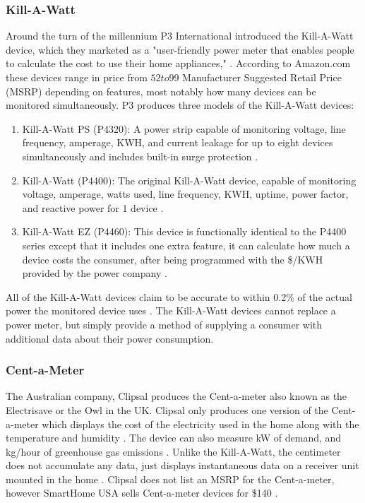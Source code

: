 \subsubsection{Kill-A-Watt} %
Around the turn of the millennium P3 International introduced the Kill-A-Watt device, which they marketed as a "user-friendly power meter that enables people to calculate the cost to use their home appliances," \cite{About_P3}. According to Amazon.com these devices range in price from $52 to $99 Manufacturer Suggested Retail Price (MSRP) depending on features, most notably how many devices can be monitored simultaneously. P3 produces three models of the Kill-A-Watt devices:
\begin{enumerate}
\item Kill-A-Watt PS (P4320): A power strip capable of monitoring voltage, line frequency, amperage, KWH, and current leakage for up to eight devices simultaneously and includes built-in surge protection \cite{P4320_Datasheet}.
\item Kill-A-Watt (P4400): The original Kill-A-Watt device, capable of monitoring voltage, amperage, watts used, line frequency, KWH, uptime, power factor, and reactive power for 1 device \cite{P4400_Datasheet}.
\item Kill-A-Watt EZ (P4460): This device is functionally identical to the P4400 series except that it includes one extra feature, it can calculate how much a device costs the consumer, after being programmed with the \$/KWH provided by the power company \cite{P4460_Datasheet}.
\end{enumerate}
All of the Kill-A-Watt devices claim to be accurate to within 0.2\% of the actual power the monitored device uses \cite{P4320_Datasheet}\cite{P4400_Datasheet}\cite{P4460_Datasheet}. The Kill-A-Watt devices cannot replace a power meter, but simply provide a method of supplying a consumer with additional data about their power consumption.

\subsubsection{Cent-a-Meter} %
The Australian company, Clipsal produces the Cent-a-meter also known as the Electrisave or the Owl in the UK. Clipsal only produces one version of the Cent-a-meter which displays the cost of the electricity used in the home along with the temperature and humidity \cite{Clipsal_CentAMeter}. The device can also measure kW of demand, and kg/hour of greenhouse gas emissions \cite{SmartHomeUSA}. Unlike the Kill-A-Watt, the centimeter does not accumulate any data, just displays instantaneous data on a receiver unit mounted in the home \cite{Clipsal_CentAMeter}. Clipsal does not list an MSRP for the Cent-a-meter, however SmartHome USA sells Cent-a-meter devices for \$140 \cite{SmartHomeUSA}.

